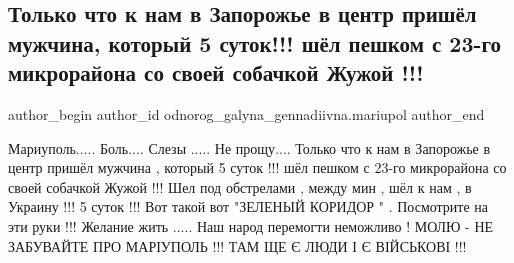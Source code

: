  
 
 
 
 

\subsection{Только что к нам в Запорожье в центр пришёл мужчина, который 5 суток!!! шёл пешком с 23-го микрорайона со своей собачкой Жужой !!!}
\label{sec:27_04_2022.fb.odnorog_galyna_gennadiivna.mariupol.1.muzhchina_sobaka_shel_5_sutok}

\ifcmt
 author_begin
   author_id odnorog_galyna_gennadiivna.mariupol
 author_end
\fi

\obeycr
Мариуполь.....
Боль....
Слезы .....
Не прощу....
Только что к нам в Запорожье в центр пришёл мужчина , который 5 суток !!! шёл пешком с 23-го микрорайона со своей собачкой Жужой !!!
Шел под обстрелами , между мин , 
шёл к нам , в Украину !!! 
5 суток !!!
Вот такой вот "ЗЕЛЕНЫЙ КОРИДОР  " .
Посмотрите на эти руки !!!
Желание жить .....
Наш народ перемогти неможливо !
МОЛЮ - НЕ ЗАБУВАЙТЕ ПРО МАРІУПОЛЬ !!!
ТАМ ЩЕ Є ЛЮДИ І Є ВІЙСЬКОВІ !!!
\restorecr

